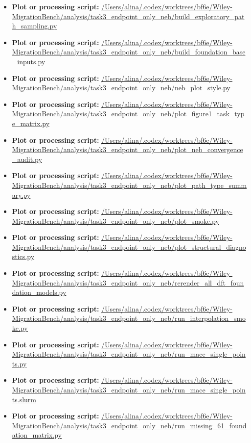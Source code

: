 \begin{itemize}[leftmargin=1.4em,noitemsep]
\item \textbf{Plot or processing script:} \url{/Users/alina/.codex/worktrees/bf6e/Wiley-MigrationBench/analysis/task3_endpoint_only_neb/build_exploratory_path_sampling.py}
\item \textbf{Plot or processing script:} \url{/Users/alina/.codex/worktrees/bf6e/Wiley-MigrationBench/analysis/task3_endpoint_only_neb/build_foundation_base_inputs.py}
\item \textbf{Plot or processing script:} \url{/Users/alina/.codex/worktrees/bf6e/Wiley-MigrationBench/analysis/task3_endpoint_only_neb/neb_plot_style.py}
\item \textbf{Plot or processing script:} \url{/Users/alina/.codex/worktrees/bf6e/Wiley-MigrationBench/analysis/task3_endpoint_only_neb/plot_figure1_task_type_matrix.py}
\item \textbf{Plot or processing script:} \url{/Users/alina/.codex/worktrees/bf6e/Wiley-MigrationBench/analysis/task3_endpoint_only_neb/plot_neb_convergence_audit.py}
\item \textbf{Plot or processing script:} \url{/Users/alina/.codex/worktrees/bf6e/Wiley-MigrationBench/analysis/task3_endpoint_only_neb/plot_path_type_summary.py}
\item \textbf{Plot or processing script:} \url{/Users/alina/.codex/worktrees/bf6e/Wiley-MigrationBench/analysis/task3_endpoint_only_neb/plot_smoke.py}
\item \textbf{Plot or processing script:} \url{/Users/alina/.codex/worktrees/bf6e/Wiley-MigrationBench/analysis/task3_endpoint_only_neb/plot_structural_diagnostics.py}
\item \textbf{Plot or processing script:} \url{/Users/alina/.codex/worktrees/bf6e/Wiley-MigrationBench/analysis/task3_endpoint_only_neb/rerender_all_dft_foundation_models.py}
\item \textbf{Plot or processing script:} \url{/Users/alina/.codex/worktrees/bf6e/Wiley-MigrationBench/analysis/task3_endpoint_only_neb/run_interpolation_smoke.py}
\item \textbf{Plot or processing script:} \url{/Users/alina/.codex/worktrees/bf6e/Wiley-MigrationBench/analysis/task3_endpoint_only_neb/run_mace_single_points.py}
\item \textbf{Plot or processing script:} \url{/Users/alina/.codex/worktrees/bf6e/Wiley-MigrationBench/analysis/task3_endpoint_only_neb/run_mace_single_points.slurm}
\item \textbf{Plot or processing script:} \url{/Users/alina/.codex/worktrees/bf6e/Wiley-MigrationBench/analysis/task3_endpoint_only_neb/run_missing_61_foundation_matrix.py}
\end{itemize}
